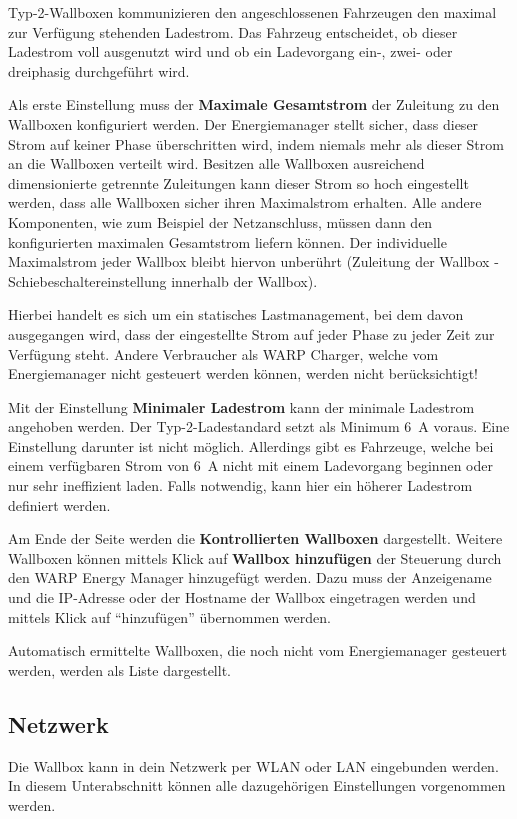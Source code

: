 \documentclass[a4paper,10pt]{article}
\newcommand{\hint}[1]{\begin{tcolorbox}[colback=boxgray,colframe=black,coltext=
white,title=Hinweis,left*=2mm,right*=2mm,boxsep=1mm,bottom=1mm,top=1mm]#1\end{tcolorbox}}
\begin{document}
\begin{multicols*}{2}
	Typ-2-Wallboxen kommunizieren den angeschlossenen Fahrzeugen den maximal zur
	Verfügung stehenden Ladestrom. Das Fahrzeug entscheidet, ob dieser Ladestrom
	voll ausgenutzt wird und ob ein Ladevorgang ein-, zwei- oder dreiphasig durchgeführt
	wird.

	Als erste Einstellung muss der \textbf{Maximale Gesamtstrom}
	der Zuleitung zu den Wallboxen konfiguriert werden.
	Der Energiemanager stellt sicher, dass dieser
	Strom auf keiner Phase überschritten wird, indem niemals mehr als
	dieser Strom an die Wallboxen verteilt wird. Besitzen alle Wallboxen
	ausreichend dimensionierte getrennte Zuleitungen kann dieser Strom so
	hoch eingestellt werden, dass alle Wallboxen sicher ihren Maximalstrom
	erhalten. Alle andere Komponenten, wie zum Beispiel der Netzanschluss,
	müssen dann den konfigurierten maximalen Gesamtstrom liefern können.
	Der individuelle Maximalstrom jeder Wallbox bleibt hiervon unberührt
	(Zuleitung der Wallbox - Schiebeschaltereinstellung innerhalb der Wallbox).

	\hint{Hierbei handelt es sich um ein statisches Lastmanagement, bei dem
	davon ausgegangen wird, dass der eingestellte Strom auf jeder Phase
	zu jeder Zeit zur Verfügung steht. Andere Verbraucher als WARP Charger,
	welche vom Energiemanager nicht gesteuert werden können, werden nicht
	berücksichtigt!}

	Mit der Einstellung \textbf{Minimaler Ladestrom} kann der minimale Ladestrom
	angehoben werden. Der Typ-2-Ladestandard setzt als Minimum \SI{6}{\ampere} voraus. Eine
	Einstellung darunter ist nicht möglich. Allerdings gibt es Fahrzeuge, welche
	bei einem verfügbaren Strom von \SI{6}{\ampere} nicht mit einem Ladevorgang beginnen
	oder nur sehr ineffizient laden. Falls notwendig, kann hier ein höherer Ladestrom definiert werden.

	Am Ende der Seite werden die \textbf{Kontrollierten
	Wallboxen} dargestellt. Weitere Wallboxen können mittels Klick auf
	\textbf{Wallbox hinzufügen} der Steuerung durch den WARP Energy Manager
	hinzugefügt werden. Dazu muss der Anzeigename und die IP-Adresse oder der
	Hostname der Wallbox eingetragen werden und mittels Klick auf \enquote{hinzufügen} übernommen werden.

	Automatisch ermittelte Wallboxen, die noch nicht vom Energiemanager
	gesteuert werden, werden als Liste dargestellt.

	\subsection{Netzwerk}
	\label{network}
	Die Wallbox kann in dein Netzwerk per WLAN oder LAN eingebunden werden.
	In diesem Unterabschnitt können alle dazugehörigen Einstellungen vorgenommen werden.


\end{multicols*}
\end{document}

